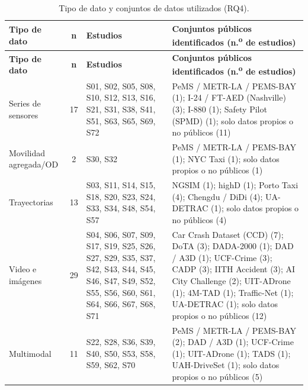 \begingroup
\small
\begin{xltabular}{\linewidth}{lcXX}
\caption{Tipo de dato y conjuntos de datos utilizados (RQ4).}\label{tab:datos}\\
\toprule
\textbf{Tipo de dato} & \textbf{n} & \textbf{Estudios} & \textbf{Conjuntos p\'{u}blicos identificados (n.\textsuperscript{o} de estudios)} \\
\midrule\endfirsthead
\toprule
\textbf{Tipo de dato} & \textbf{n} & \textbf{Estudios} & \textbf{Conjuntos p\'{u}blicos identificados (n.\textsuperscript{o} de estudios)} \\
\midrule\endhead
\bottomrule\endfoot
Series de sensores & 17 & S01, S02, S05, S08, S10, S12, S13, S16, S21, S31, S38, S41, S51, S63, S65, S69, S72 & PeMS / METR-LA / PEMS-BAY (1); I-24 / FT-AED (Nashville) (3); I-880 (1); Safety Pilot (SPMD) (1); solo datos propios o no p\'{u}blicos (11) \\
Movilidad agregada/OD & 2 & S30, S32 & PeMS / METR-LA / PEMS-BAY (1); NYC Taxi (1); solo datos propios o no p\'{u}blicos (1) \\
Trayectorias & 13 & S03, S11, S14, S15, S18, S20, S23, S24, S33, S34, S48, S54, S57 & NGSIM (1); highD (1); Porto Taxi (4); Chengdu / DiDi (4); UA-DETRAC (1); solo datos propios o no p\'{u}blicos (4) \\
Video e im\'{a}genes & 29 & S04, S06, S07, S09, S17, S19, S25, S26, S27, S29, S35, S37, S42, S43, S44, S45, S46, S47, S49, S52, S55, S56, S60, S61, S64, S66, S67, S68, S71 & Car Crash Dataset (CCD) (7); DoTA (3); DADA-2000 (1); DAD / A3D (1); UCF-Crime (3); CADP (3); IITH Accident (3); AI City Challenge (2); UIT-ADrone (1); 4M-TAD (1); Traffic-Net (1); UA-DETRAC (1); solo datos propios o no p\'{u}blicos (12) \\
Multimodal & 11 & S22, S28, S36, S39, S40, S50, S53, S58, S59, S62, S70 & PeMS / METR-LA / PEMS-BAY (2); DAD / A3D (1); UCF-Crime (1); UIT-ADrone (1); TADS (1); UAH-DriveSet (1); solo datos propios o no p\'{u}blicos (5) \\
\end{xltabular}
\endgroup
